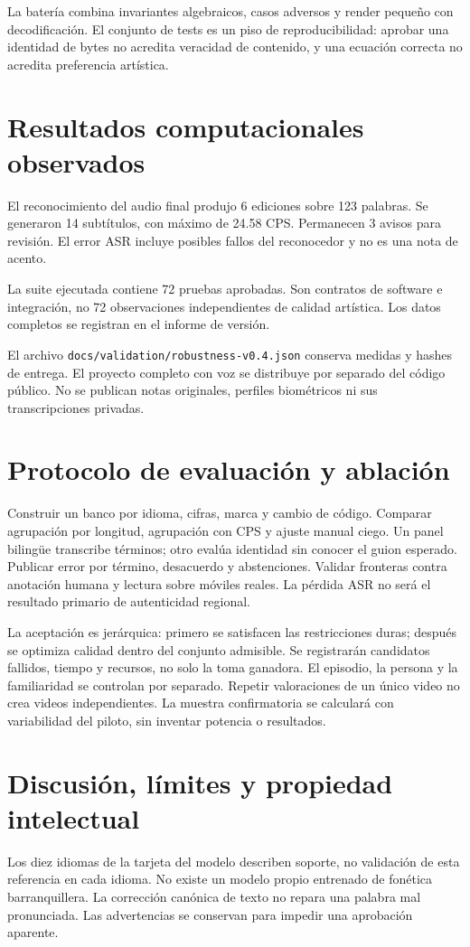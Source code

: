 \documentclass[10pt,a4paper]{article}
\begin{document}
La batería combina invariantes algebraicos, casos adversos y render pequeño con decodificación. El conjunto de tests es un piso de reproducibilidad: aprobar una identidad de bytes no acredita veracidad de contenido, y una ecuación correcta no acredita preferencia artística.
\section{Resultados computacionales observados}
El reconocimiento del audio final produjo 6 ediciones sobre 123 palabras. Se generaron 14 subtítulos, con máximo de 24.58 CPS. Permanecen 3 avisos para revisión. El error ASR incluye posibles fallos del reconocedor y no es una nota de acento.

La suite ejecutada contiene 72 pruebas aprobadas. Son contratos de software e integración, no 72 observaciones independientes de calidad artística. Los datos completos se registran en el informe de versión.

El archivo \texttt{docs/validation/robustness-v0.4.json} conserva medidas y hashes de entrega. El proyecto completo con voz se distribuye por separado del código público. No se publican notas originales, perfiles biométricos ni sus transcripciones privadas.
\section{Protocolo de evaluación y ablación}
Construir un banco por idioma, cifras, marca y cambio de código. Comparar agrupación por longitud, agrupación con CPS y ajuste manual ciego. Un panel bilingüe transcribe términos; otro evalúa identidad sin conocer el guion esperado. Publicar error por término, desacuerdo y abstenciones. Validar fronteras contra anotación humana y lectura sobre móviles reales. La pérdida ASR no será el resultado primario de autenticidad regional.

La aceptación es jerárquica: primero se satisfacen las restricciones duras; después se optimiza calidad dentro del conjunto admisible. Se registrarán candidatos fallidos, tiempo y recursos, no solo la toma ganadora. El episodio, la persona y la familiaridad se controlan por separado. Repetir valoraciones de un único video no crea videos independientes. La muestra confirmatoria se calculará con variabilidad del piloto, sin inventar potencia o resultados.
\section{Discusión, límites y propiedad intelectual}
Los diez idiomas de la tarjeta del modelo describen soporte, no validación de esta referencia en cada idioma. No existe un modelo propio entrenado de fonética barranquillera. La corrección canónica de texto no repara una palabra mal pronunciada. Las advertencias se conservan para impedir una aprobación aparente.
\end{document}
